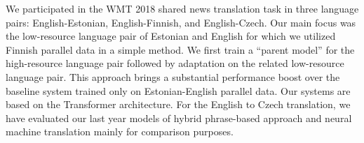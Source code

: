 We participated in the WMT 2018 shared news translation task in three language pairs: English-Estonian, English-Finnish, and English-Czech. Our main focus was the low-resource language pair of Estonian and English for which we utilized Finnish parallel data in a simple method. We first train a ``parent model'' for the high-resource language pair followed by adaptation on the related low-resource language pair. This approach brings a substantial performance boost over the baseline system trained only on Estonian-English parallel data. Our systems are based on the Transformer architecture. For the English to Czech translation, we have evaluated our last year models of hybrid phrase-based approach and neural machine translation mainly for comparison purposes.
